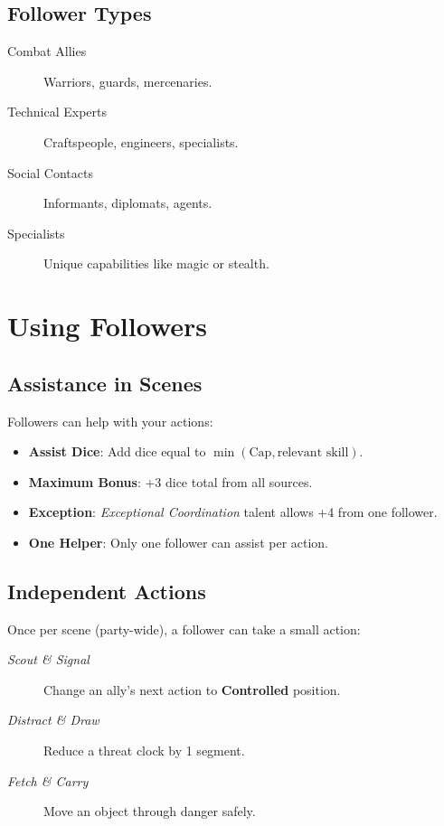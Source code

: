\begin{multicols}{2}
\subsection*{Follower Types}
\begin{description}
\item[Combat Allies] Warriors, guards, mercenaries.
\item[Technical Experts] Craftspeople, engineers, specialists.
\item[Social Contacts] Informants, diplomats, agents.
\item[Specialists] Unique capabilities like magic or stealth.
\end{description}

\section{Using Followers}

\subsection*{Assistance in Scenes}
Followers can help with your actions:
\begin{itemize}
\item \textbf{Assist Dice}: Add dice equal to $\min(\text{Cap}, \text{relevant skill})$.
\item \textbf{Maximum Bonus}: +3 dice total from all sources.
\item \textbf{Exception}: \emph{Exceptional Coordination} talent allows +4 from one follower.
\item \textbf{One Helper}: Only one follower can assist per action.
\end{itemize}

\subsection*{Independent Actions}
Once per scene (party-wide), a follower can take a small action:
\begin{description}
\item[\emph{Scout \& Signal}] Change an ally's next action to \textbf{Controlled} position.
\item[\emph{Distract \& Draw}] Reduce a threat clock by 1 segment.
\item[\emph{Fetch \& Carry}] Move an object through danger safely.
\end{description}


\end{multicols}
